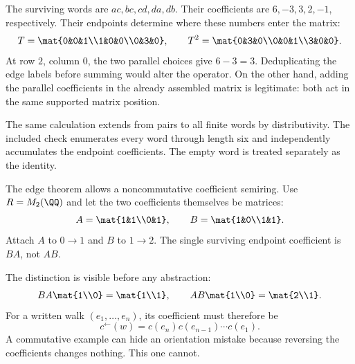 The surviving words are $ac,bc,cd,da,db$. Their coefficients are $6,-3,3,2,-1$, respectively. Their endpoints determine where these numbers enter the matrix:
\[
T=\mat{0&0&1\\1&0&0\\0&3&0},\qquad
T^2=\mat{0&3&0\\0&0&1\\3&0&0}.
\]
At row $2$, column $0$, the two parallel choices give $6-3=3$. Deduplicating the edge labels before summing would alter the operator. On the other hand, adding the parallel coefficients in the already assembled matrix is legitimate: both act in the same supported matrix position.

The same calculation extends from pairs to all finite words by distributivity. The included check enumerates every word through length six and independently accumulates the endpoint coefficients. The empty word is treated separately as the identity.


The edge theorem allows a noncommutative coefficient semiring. Use $R=M_2(\QQ)$ and let the two coefficients themselves be matrices:
\[
A=\mat{1&1\\0&1},\qquad B=\mat{1&0\\1&1}.
\]
Attach $A$ to $0\to1$ and $B$ to $1\to2$. The single surviving endpoint coefficient is $BA$, not $AB$.


The distinction is visible before any abstraction:
\[
BA\mat{1\\0}=\mat{1\\1},\qquad
AB\mat{1\\0}=\mat{2\\1}.
\]
For a written walk $(e_1,\ldots,e_n)$, its coefficient must therefore be
\[
c^\leftarrow(w)=c(e_n)c(e_{n-1})\cdots c(e_1).
\]
A commutative example can hide an orientation mistake because reversing the coefficients changes nothing. This one cannot.


